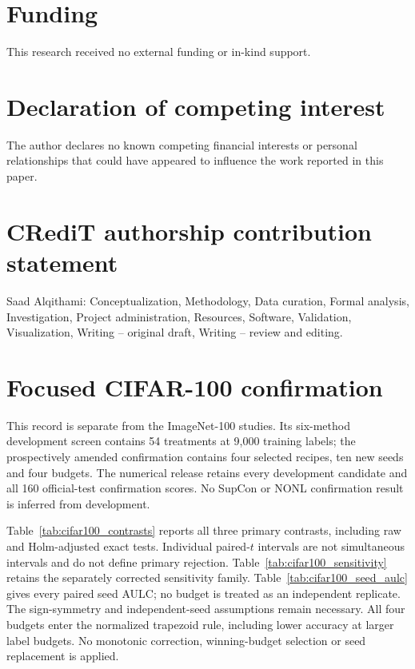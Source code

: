 \documentclass[10pt,a4paper,twocolumn]{article}
\begin{document}
\section*{Funding}
This research received no external funding or in-kind support.

\section*{Declaration of competing interest}
The author declares no known competing financial interests or personal
relationships that could have appeared to influence the work reported
in this paper.

\section*{CRediT authorship contribution statement}
Saad Alqithami: Conceptualization, Methodology, Data curation,
Formal analysis, Investigation, Project administration, Resources,
Software, Validation, Visualization, Writing -- original draft,
Writing -- review and editing.

\FloatBarrier
\appendix

\section{Focused CIFAR-100 confirmation}
\label{app:cifar100_confirmation}

This record is separate from the ImageNet-100 studies. Its six-method
development screen contains 54 treatments at 9,000 training labels;
the prospectively amended confirmation contains four selected recipes,
ten new seeds and four budgets. The numerical release retains every
development candidate and all 160 official-test confirmation scores.
No SupCon or NONL confirmation result is inferred from development.

Table~\ref{tab:cifar100_contrasts} reports all three primary contrasts,
including raw and Holm-adjusted exact tests. Individual paired-$t$
intervals are not simultaneous intervals and do not define primary
rejection. Table~\ref{tab:cifar100_sensitivity} retains the separately
corrected sensitivity family. Table~\ref{tab:cifar100_seed_aulc} gives
every paired seed AULC; no budget is treated as an independent replicate.
The sign-symmetry and independent-seed assumptions remain necessary.
All four budgets enter the normalized trapezoid rule, including lower
accuracy at larger label budgets. No monotonic correction, winning-budget
selection or seed replacement is applied.
\end{document}
